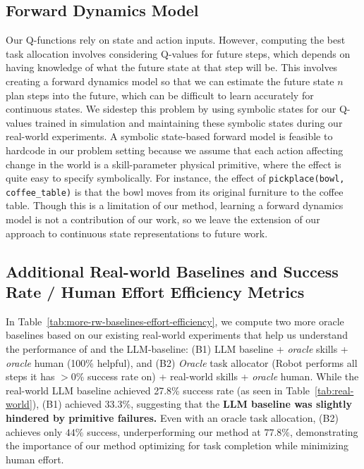 \subsection*{Forward Dynamics Model}
Our Q-functions rely on state and action inputs. However, computing the best task allocation involves considering Q-values for future steps, which depends on having knowledge of what the future state at that step will be. This involves creating a forward dynamics model so that we can estimate the future state $n$ plan steps into the future, which can be difficult to learn accurately for continuous states. We sidestep this problem by using symbolic states for our Q-values trained in simulation and maintaining these symbolic states during our real-world experiments. A symbolic state-based forward model is feasible to hardcode in our problem setting because we assume that each action affecting change in the world is a skill-parameter physical primitive, where the effect is quite easy to specify symbolically. For instance, the effect of \texttt{pickplace(bowl, coffee\_table)} is that the bowl moves from its original furniture to the coffee table. Though this is a limitation of our method, learning a forward dynamics model is not a contribution of our work, so we leave the extension of our approach to continuous state representations to future work.

\subsection{Additional Real-world Baselines and Success Rate / Human Effort Efficiency Metrics}
\label{app:more-rw-baselines-h-effort-efficiency}

In Table~\ref{tab:more-rw-baselines-effort-efficiency}, we compute two more oracle baselines based on our existing real-world experiments that help us understand the performance of \ours{} and the LLM-baseline: (B1) LLM baseline + \textit{oracle} skills + \textit{oracle} human (100\% helpful), and (B2) \textit{Oracle} task allocator (Robot performs all steps it has $>0\%$ success rate on) + real-world skills + \textit{oracle} human. While the real-world LLM baseline achieved 27.8\% success rate (as seen in Table~\ref{tab:real-world}), (B1) achieved 33.3\%, suggesting that the \textbf{LLM baseline was slightly hindered by primitive failures.} Even with an oracle task allocation, (B2) achieves only $44\%$ success, underperforming our method at $77.8\%$, demonstrating the importance of our method optimizing for task completion while minimizing human effort.

